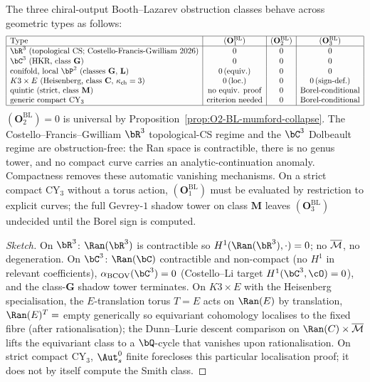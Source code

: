 \begin{proposition}
\label{prop:cfg-vs-compact-bl}
The three chiral-output Booth--Lazarev
obstruction classes behave across geometric types as follows:
\[
\begin{array}{|l|c|c|c|}
\hline
\text{Type} & (\mathbf{O}_1^{\mathrm{BL}}) & (\mathbf{O}_2^{\mathrm{BL}}) & (\mathbf{O}_3^{\mathrm{BL}}) \\
\hline
\bR^3 \text{ (topological CS; Costello-Francis-Gwilliam}\ 2026) & 0 & 0 & 0 \\
\bC^3 \text{ (HKR, class } \mathbf{G}) & 0 & 0 & 0 \\
\text{conifold, local }\bP^2 \text{ (classes } \mathbf{G},\,\mathbf{L}) & 0\,(\text{equiv.}) & 0 & 0 \\
	K3 \times E \text{ (Heisenberg, class } \mathbf{C},\, \kch = 3) & 0\,(\text{loc.}) & 0 & 0\,(\text{sign-def.}) \\
	\text{quintic (strict, class } \mathbf{M}) & \text{no equiv. proof} & 0 & \text{Borel-conditional} \\
	\text{generic compact CY$_3$} & \text{criterion needed} & 0 & \text{Borel-conditional} \\
\hline
\end{array}
\]
$(\mathbf{O}_2^{\mathrm{BL}})=0$ is universal by
Proposition~\ref{prop:O2-BL-mumford-collapse}. The
Costello--Francis--Gwilliam $\bR^3$ topological-CS regime and the
$\bC^3$ Dolbeault regime are obstruction-free: the Ran space is
contractible, there is no genus tower, and no compact curve carries
an analytic-continuation anomaly. Compactness removes these automatic
vanishing mechanisms. On a strict compact CY$_3$ without a torus action,
$(\mathbf{O}_1^{\mathrm{BL}})$ must be evaluated by restriction to
explicit curves; the full Gevrey-$1$ shadow tower on class $\mathbf{M}$
leaves $(\mathbf{O}_3^{\mathrm{BL}})$ undecided until the Borel sign is
computed.
\end{proposition}

\begin{proof}[Sketch]
On $\bR^3$: $\Ran(\bR^3)$ is contractible so $H^1(\Ran(\bR^3),
\cdot) = 0$; no $\overline{\mathcal{M}}$, no degeneration. On $\bC^3$: $\Ran(\bC)$
contractible and non-compact (no $H^1$ in relevant coefficients),
$\alpha_{\mathrm{BCOV}}(\bC^3) = 0$ (Costello--Li target $H^1(\bC^3,
\cO) = 0$), and the class-$\mathbf{G}$ shadow tower terminates.
On $K3 \times E$ with the Heisenberg specialisation, the
$E$-translation torus $T = E$ acts on $\Ran(E)$ by translation,
$\Ran(E)^T = $ empty generically so equivariant cohomology localises
to the fixed fibre (after rationalisation); the Dunn--Lurie descent
comparison on \(\Ran(C)\times\Mbar\) lifts
the equivariant class to a $\bQ$-cycle that vanishes upon
rationalisation. On strict compact CY$_3$, $\Aut^0_s$ finite forecloses
this particular localisation proof; it does not by itself compute the
Smith class.
\end{proof}

